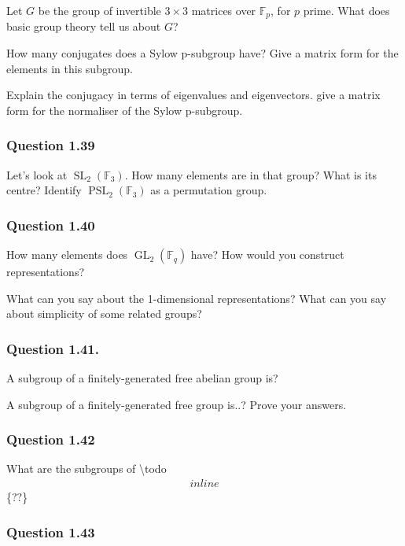 Let \(G\) be the group of invertible \(3\times 3\) matrices over
\({\mathbb{F}}_p\), for \(p\) prime. What does basic group theory tell
us about \(G\)?

How many conjugates does a Sylow p-subgroup have? Give a matrix form for
the elements in this subgroup.

Explain the conjugacy in terms of eigenvalues and eigenvectors. give a
matrix form for the normaliser of the Sylow p-subgroup.

\hypertarget{question-1.39}{%
\subsubsection{Question 1.39}\label{question-1.39}}

Let's look at \({\operatorname{SL}}_2({\mathbb{F}}_3)\). How many
elements are in that group? What is its centre? Identify
\({\operatorname{PSL}}_2({\mathbb{F}}_3)\) as a permutation group.

\hypertarget{question-1.40}{%
\subsubsection{Question 1.40}\label{question-1.40}}

How many elements does \(\operatorname{GL}_2({\mathbb{F}}_q)\) have? How
would you construct representations?

What can you say about the 1-dimensional representations? What can you
say about simplicity of some related groups?

\hypertarget{question-1.41.}{%
\subsubsection{Question 1.41.}\label{question-1.41.}}

A subgroup of a finitely-generated free abelian group is?

A subgroup of a finitely-generated free group is..? Prove your answers.

\hypertarget{question-1.42}{%
\subsubsection{Question 1.42}\label{question-1.42}}

What are the subgroups of \textbackslash todo
\begin{align*}inline\end{align*}
\{??\}

\hypertarget{question-1.43}{%
\subsubsection{Question 1.43}\label{question-1.43}}

